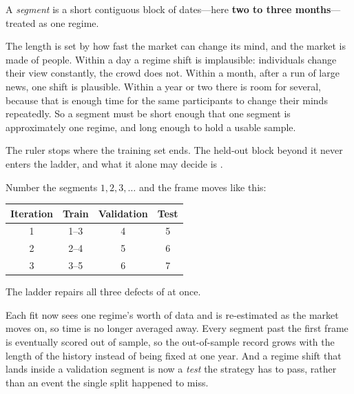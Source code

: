 \begin{definition}[Segment]\label{def:segment}
A \emph{segment} is a short contiguous block of dates---here \textbf{two to three months}---treated
as one regime.
\end{definition}

The length is set by how fast the market can change its mind, and the market is made of people.
Within a day a regime shift is implausible: individuals change their view constantly, the crowd
does not. Within a month, after a run of large news, one shift is plausible. Within a year or two
there is room for several, because that is enough time for the same participants to change their
minds repeatedly. So a segment must be short enough that one segment is approximately one regime,
and long enough to hold a usable sample.


The ruler stops where the training set ends. The held-out block beyond it never enters the ladder,
and what it alone may decide is .

Number the segments $1, 2, 3, \ldots$ and the frame moves like this:

\begin{center}
\begin{tabular}{|c|c|c|c|}
\hline
\textbf{Iteration} & \textbf{Train} & \textbf{Validation} & \textbf{Test} \\ \hline
1 & 1--3 & 4 & 5 \\ \hline
2 & 2--4 & 5 & 6 \\ \hline
3 & 3--5 & 6 & 7 \\ \hline
\end{tabular}
\end{center}

\begin{claim}\label{clm:ladder-repairs}
The ladder repairs all three defects of  at once.
\end{claim}

Each fit now sees one regime's worth of data and is re-estimated as the market moves on, so time
is no longer averaged away. Every segment past the first frame is eventually scored out of sample,
so the out-of-sample record grows with the length of the history instead of being fixed at one
year. And a regime shift that lands inside a validation segment is now a \emph{test} the strategy
has to pass, rather than an event the single split happened to miss.

